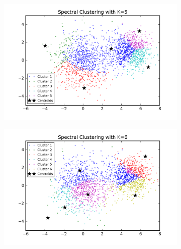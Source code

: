 \begin{description}
\begin{description}
\begin{figure}[!h]
\begin{subfigure}[b]{0.475\textwidth}
        \end{subfigure}
        \begin{subfigure}[b]{0.475\textwidth}  
            \centering 
            \includegraphics[width=\textwidth]{./figures/clustering_spectral_5.png}
        \end{subfigure}
        \hfill
        \begin{subfigure}[b]{0.475\textwidth}   
            \centering 
            \includegraphics[width=\textwidth]{./figures/clustering_spectral_6.png}
        \end{subfigure}
        \begin{subfigure}[b]{0.475\textwidth}   
            \centering 

\end{subfigure}
\end{figure}
\end{description}
\end{description}
